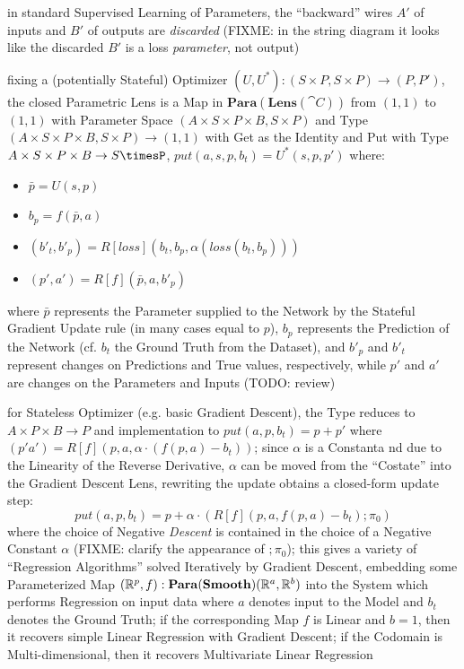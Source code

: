 in standard Supervised Learning of Parameters, the ``backward'' wires $A'$ of
inputs and $B'$ of outputs are \emph{discarded} (FIXME: in the string diagram it
looks like the discarded $B'$ is a loss \emph{parameter}, not output)

fixing a (potentially Stateful) Optimizer
$(U,U^*) : (S \times P, S \times P) \to (P,P')$, the closed Parametric Lens
is a Map in $\mathbf{Para}(\mathbf{Lens}(\cat{C}))$ from $(1,1)$ to $(1,1)$ with
Parameter Space $(A \times S \times P \times B, S \times P)$ and Type
$(A \times S \times P \times B, S \times P) \to (1,1)$ with Get as the Identity
and Put with Type $A \times S \times P \times B \to S \timesP$,
$put(a,s,p,b_t) = U^*(s,p,p')$ where:
\begin{itemize}
  \item $\bar{p} = U(s,p)$
  \item $b_p = f(\bar{p}, a)$
  \item $(b'_t,b'_p) = R[loss](b_t,b_p,\alpha(loss(b_t,b_p)))$
  \item $(p',a') = R[f](\bar{p},a,b'_p)$
\end{itemize}
where $\bar{p}$ represents the Parameter supplied to the Network by the Stateful
Gradient Update rule (in many cases equal to $p$), $b_p$ represents the
Prediction of the Network (cf. $b_t$ the Ground Truth from the Dataset), and
$b'_p$ and $b'_t$ represent changes on Predictions and True values,
respectively, while $p'$ and $a'$ are changes on the Parameters and Inputs
(TODO: review)

for Stateless Optimizer (e.g. basic Gradient Descent), the Type reduces to
$A \times P \times B \to P$ and implementation to
$put(a,p,b_t) = p+p'$ where $(p'a') = R[f](p,a,\alpha \cdot (f(p,a) - b_t))$;
since $\alpha$ is a Constanta nd due to the Linearity of the Reverse Derivative,
$\alpha$ can be moved from the ``Costate'' into the Gradient Descent Lens,
rewriting the update obtains a closed-form update step:
\[
  put(a,p,b_t) = p + \alpha \cdot (R[f](p,a,f(p,a) - b_t); \pi_0)
\]
where the choice of Negative \emph{Descent} is contained in the choice of a
Negative Constant $\alpha$
(FIXME: clarify the appearance of $; \pi_0$);
this gives a variety of ``Regression Algorithms'' solved Iteratively by Gradient
Descent, embedding some Parameterized Map
$(\mathbb{R}^p,f) : \mathbf{Para}(\mathbf{Smooth})(\mathbb{R}^a,\mathbb{R}^b)$ into the System
which performs Regression on input data where $a$ denotes input to the Model and
$b_t$ denotes the Ground Truth; if the corresponding Map $f$ is Linear and
$b = 1$, then it recovers simple Linear Regression with Gradient Descent; if the
Codomain is Multi-dimensional, then it recovers Multivariate Linear Regression

